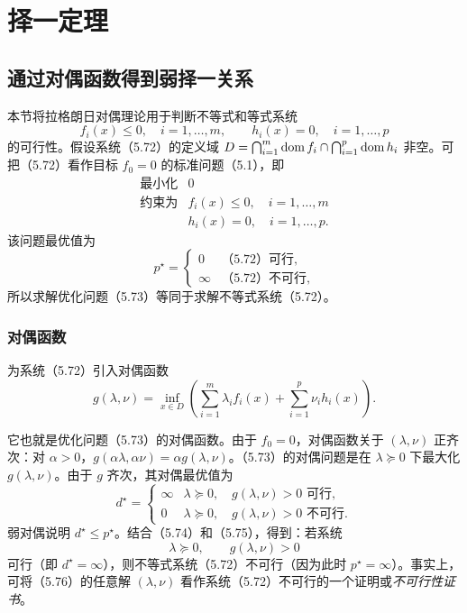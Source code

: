 \section{择一定理}
\subsection{通过对偶函数得到弱择一关系}
本节将拉格朗日对偶理论用于判断不等式和等式系统
\begin{equation}
f_i(x)\le0,\quad i=1,\ldots,m,\qquad
h_i(x)=0,\quad i=1,\ldots,p\tag{5.72}
\end{equation}
的可行性。假设系统（5.72）的定义域
$D=\bigcap_{i=1}^m\operatorname{dom} f_i\cap\bigcap_{i=1}^p\operatorname{dom} h_i$ 非空。可把（5.72）看作目标 $f_0=0$ 的标准问题（5.1），即
\begin{equation}
\begin{array}{ll}\text{最小化}&0\\
\text{约束为}&f_i(x)\le0,\quad i=1,\ldots,m\\
&h_i(x)=0,\quad i=1,\ldots,p.
\end{array}\tag{5.73}
\end{equation}
该问题最优值为
\begin{equation}
p^\star=\begin{cases}
0&\text{（5.72）可行},\\
\infty&\text{（5.72）不可行},
\end{cases}\tag{5.74}
\end{equation}
所以求解优化问题（5.73）等同于求解不等式系统（5.72）。

\subsubsection*{对偶函数}
为系统（5.72）引入对偶函数
\[
g(\lambda,\nu)=\inf_{x\in D}\left(\sum_{i=1}^m\lambda_i f_i(x)+\sum_{i=1}^p\nu_i h_i(x)\right).
\]

它也就是优化问题（5.73）的对偶函数。由于 $f_0=0$，对偶函数关于 $(\lambda,\nu)$ 正齐次：对 $\alpha>0$，$g(\alpha\lambda,\alpha\nu)=\alpha g(\lambda,\nu)$。（5.73）的对偶问题是在 $\lambda\succeq0$ 下最大化 $g(\lambda,\nu)$。由于 $g$ 齐次，其对偶最优值为
\begin{equation}
d^\star=\begin{cases}
\infty&\lambda\succeq0,\quad g(\lambda,\nu)>0\text{ 可行},\\
0&\lambda\succeq0,\quad g(\lambda,\nu)>0\text{ 不可行}.
\end{cases}\tag{5.75}
\end{equation}
弱对偶说明 $d^\star\le p^\star$。结合（5.74）和（5.75），得到：若系统
\begin{equation}
\lambda\succeq0,\qquad g(\lambda,\nu)>0\tag{5.76}
\end{equation}
可行（即 $d^\star=\infty$），则不等式系统（5.72）不可行（因为此时 $p^\star=\infty$）。事实上，可将（5.76）的任意解 $(\lambda,\nu)$ 看作系统（5.72）不可行的一个证明或\emph{不可行性证书}。

